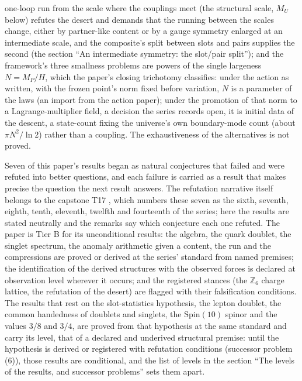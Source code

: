 \documentclass[11pt]{article}
\theoremstyle{definition}
\theoremstyle{plain}
\begin{document}
one-loop run from the scale where the couplings meet (the structural scale, $M_{U}$ below) refutes the desert and demands that the running between the scales change, either by partner-like content or by a gauge symmetry enlarged at an intermediate scale, and the composite's split between slots and pairs supplies the second (the section ``An intermediate symmetry: the slot/pair split''); and the framework's three smallness problems are powers of the single largeness $N = M_{P}/H$, which the paper's closing trichotomy classifies: under the action as written, with the frozen point's norm fixed before variation, $N$ is a parameter of the laws (an import from the action paper); under the promotion of that norm to a Lagrange-multiplier field, a decision the series records open, it is initial data of the descent, a state-count fixing the universe's own boundary-mode count (about $\pi N^{2}/\ln 2$) rather than a coupling. The exhaustiveness of the alternatives is not proved.

Seven of this paper's results began as natural conjectures that failed and were refuted into better questions, and each failure is carried as a result that makes precise the question the next result answers. The refutation narrative itself belongs to the capstone T17 \cite{ButlerT17}, which numbers these seven as the sixth, seventh, eighth, tenth, eleventh, twelfth and fourteenth of the series; here the results are stated neutrally and the remarks say which conjecture each one refuted. The paper is Tier B for its unconditional results: the algebra, the quark doublet, the singlet spectrum, the anomaly arithmetic given a content, the run and the compressions are proved or derived at the series' standard from named premises; the identification of the derived structures with the observed forces is declared at observation level wherever it occurs; and the registered stances (the $\mathbb{Z}_{6}$ charge lattice, the refutation of the desert) are flagged with their falsification conditions. The results that rest on the slot-statistics hypothesis, the lepton doublet, the common handedness of doublets and singlets, the $\mathrm{Spin}(10)$ spinor and the values $3/8$ and $3/4$, are proved from that hypothesis at the same standard and carry its level, that of a declared and underived structural premise: until the hypothesis is derived or registered with refutation conditions (successor problem (6)), those results are conditional, and the list of levels in the section ``The levels of the results, and successor problems'' sets them apart.
\end{document}
